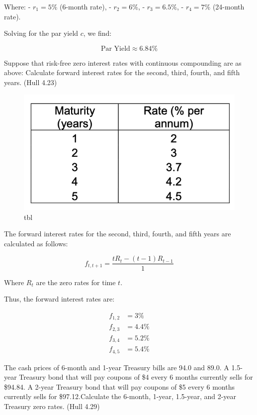\documentclass[12pt,letterpaper, onecolumn]{exam}
\begin{document}
\begin{questions}
\begin{solution}
Where:
- \( r_1 = 5\% \) (6-month rate),
- \( r_2 = 6\% \),
- \( r_3 = 6.5\% \),
- \( r_4 = 7\% \) (24-month rate).

Solving for the par yield \( c \), we find:

\[
\text{Par Yield} \approx 6.84\%
\]

    \end{solution}

    \pagebreak %
    
    \question Suppose that risk-free zero interest rates with continuous compounding are as above:
    Calculate forward interest rates for the second, third, fourth, and fifth years. (Hull 4.23)
    
    \begin{figure}
        \centering
        \includegraphics[width=.5\linewidth]{tbl.png}
        \caption{tbl}
        \label{fig:enter-label}
    \end{figure}

    \begin{solution}
            The forward interest rates for the second, third, fourth, and fifth years are calculated as follows:

\[
f_{t, t+1} = \frac{tR_t - (t-1)R_{t-1}}{1}
\]

Where \( R_t \) are the zero rates for time \( t \).

Thus, the forward interest rates are:

\[
\begin{aligned}
f_{1,2} &= 3\% \\
f_{2,3} &= 4.4\% \\
f_{3,4} &= 5.2\% \\
f_{4,5} &= 5.4\%
\end{aligned}
\]

    \end{solution}

    \newpage
    \question The cash prices of 6-month and 1-year Treasury bills are 94.0 and 89.0. A 1.5-year Treasury bond that will pay coupons of \$4 every 6 months currently sells for \$94.84. A 2-year Treasury bond that will pay coupons of \$5 every 6 months currently sells for \$97.12.Calculate the 6-month, 1-year, 1.5-year, and 2-year Treasury zero rates. (Hull 4.29)


\end{questions}
\end{document}
